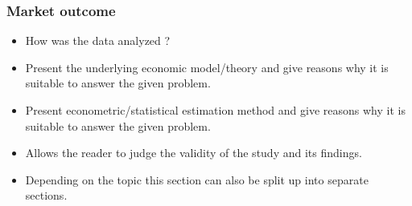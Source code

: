 \subsubsection{Market outcome}
 




\begin{itemize}

    \item How was the data analyzed ?

    \item Present the underlying economic model/theory and
        give reasons why it is suitable to answer the given problem.

    \item Present econometric/statistical estimation method and
        give reasons why it is suitable to answer the given problem.

    \item Allows the reader to judge the validity of the study and its findings.

    \item Depending on the topic this section can also be split up into separate sections.

\end{itemize}
